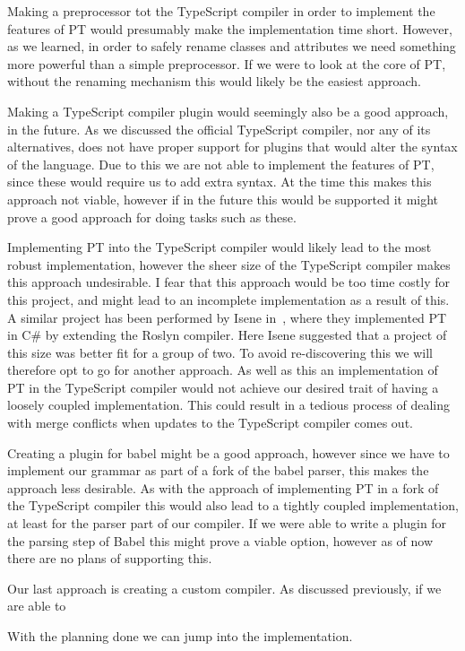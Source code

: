 Making a preprocessor tot the TypeScript compiler in order to implement the features of PT would presumably make the implementation time short.
However, as we learned, in order to safely rename classes and attributes we need something more powerful than a simple preprocessor.
If we were to look at the core of PT, without the renaming mechanism this would likely be the easiest approach.

Making a TypeScript compiler plugin would seemingly also be a good approach, in the future.
As we discussed the official TypeScript compiler, nor any of its alternatives, does not have proper support for plugins that would alter the syntax of the language.
Due to this we are not able to implement the features of PT, since these would require us to add extra syntax.
At the time this makes this approach not viable, however if in the future this would be supported it might prove a good approach for doing tasks such as these.

Implementing PT into the TypeScript compiler would likely lead to the most robust implementation, however the sheer size of the TypeScript compiler makes this approach undesirable.
I fear that this approach would be too time costly for this project, and might lead to an incomplete implementation as a result of this.
A similar project has been performed by Isene in~\cite{Isene2018}, where they implemented PT in C\# by extending the Roslyn compiler.
Here Isene suggested that a project of this size was better fit for a group of two.
To avoid re-discovering this we will therefore opt to go for another approach.
As well as this an implementation of PT in the TypeScript compiler would not achieve our desired trait of having a loosely coupled implementation.
This could result in a tedious process of dealing with merge conflicts when updates to the TypeScript compiler comes out.

Creating a plugin for babel might be a good approach, however since we have to implement our grammar as part of a fork of the babel parser, this makes the approach less desirable.
As with the approach of implementing PT in a fork of the TypeScript compiler this would also lead to a tightly coupled implementation, at least for the parser part of our compiler.
If we were able to write a plugin for the parsing step of Babel this might prove a viable option, however as of now there are no plans of supporting this.

Our last approach is creating a custom compiler.
As discussed previously, if we are able to %

With the planning done we can jump into the implementation.